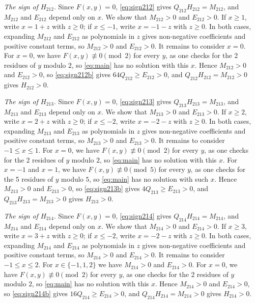 \documentclass[11pt]{article}
\begin{document}
\emph{The sign of $H_{212}$.} Since $F(x,y)=0$, \eqref{eq:sign212} gives $Q_{212}H_{212}=M_{212}$, and $M_{212}$ and $E_{212}$ depend only on $x$. We show that $M_{212}>0$ and $E_{212}>0$. If $x\geq1$, write $x=1+z$ with $z\geq0$; if $x\leq-1$, write $x=-1-z$ with $z\geq0$. In both cases, expanding $M_{212}$ and $E_{212}$ as polynomials in $z$ gives non-negative coefficients and positive constant terms, so $M_{212}>0$ and $E_{212}>0$. It remains to consider $x=0$. For $x=0$, we have $F(x,y)\not\equiv0\pmod{2}$ for every $y$, as one checks for the 2 residues of $y$ modulo $2$, so \eqref{eq:main} has no solution with this $x$. Hence $M_{212}>0$ and $E_{212}>0$, so \eqref{eq:sign212b} gives $64Q_{212}\geq E_{212}>0$, and $Q_{212}H_{212}=M_{212}>0$ gives $H_{212}>0$.

\emph{The sign of $H_{213}$.} Since $F(x,y)=0$, \eqref{eq:sign213} gives $Q_{213}H_{213}=M_{213}$, and $M_{213}$ and $E_{213}$ depend only on $x$. We show that $M_{213}>0$ and $E_{213}>0$. If $x\geq2$, write $x=2+z$ with $z\geq0$; if $x\leq-2$, write $x=-2-z$ with $z\geq0$. In both cases, expanding $M_{213}$ and $E_{213}$ as polynomials in $z$ gives non-negative coefficients and positive constant terms, so $M_{213}>0$ and $E_{213}>0$. It remains to consider $-1\leq x\leq1$. For $x=0$, we have $F(x,y)\not\equiv0\pmod{2}$ for every $y$, as one checks for the 2 residues of $y$ modulo $2$, so \eqref{eq:main} has no solution with this $x$. For $x=-1$ and $x=1$, we have $F(x,y)\not\equiv0\pmod{5}$ for every $y$, as one checks for the 5 residues of $y$ modulo $5$, so \eqref{eq:main} has no solution with such $x$. Hence $M_{213}>0$ and $E_{213}>0$, so \eqref{eq:sign213b} gives $4Q_{213}\geq E_{213}>0$, and $Q_{213}H_{213}=M_{213}>0$ gives $H_{213}>0$.

\emph{The sign of $H_{214}$.} Since $F(x,y)=0$, \eqref{eq:sign214} gives $Q_{214}H_{214}=M_{214}$, and $M_{214}$ and $E_{214}$ depend only on $x$. We show that $M_{214}>0$ and $E_{214}>0$. If $x\geq3$, write $x=3+z$ with $z\geq0$; if $x\leq-2$, write $x=-2-z$ with $z\geq0$. In both cases, expanding $M_{214}$ and $E_{214}$ as polynomials in $z$ gives non-negative coefficients and positive constant terms, so $M_{214}>0$ and $E_{214}>0$. It remains to consider $-1\leq x\leq2$. For $x\in\{-1,\allowbreak 1,\allowbreak 2\}$ we have $M_{214}>0$ and $E_{214}>0$. For $x=0$, we have $F(x,y)\not\equiv0\pmod{2}$ for every $y$, as one checks for the 2 residues of $y$ modulo $2$, so \eqref{eq:main} has no solution with this $x$. Hence $M_{214}>0$ and $E_{214}>0$, so \eqref{eq:sign214b} gives $16Q_{214}\geq E_{214}>0$, and $Q_{214}H_{214}=M_{214}>0$ gives $H_{214}>0$.
\end{document}
